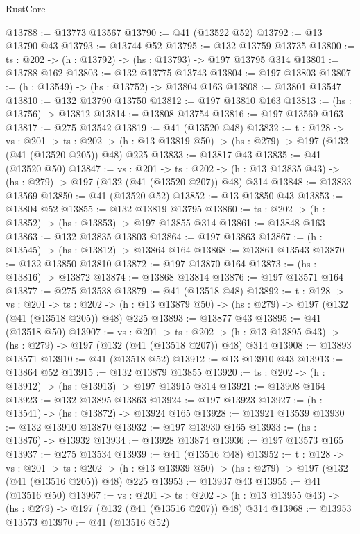 \begin{lexlean}{RustCore}
\begin{coremodule}
@13788 := @13773 @13567
@13790 := @41 (@13522 @52)
@13792 := @13 @13790 @43
@13793 := @13744 @52
@13795 := @132 @13759 @13735
@13800 := {ts : @202} -> (h : @13792) -> (hs : @13793) -> @197 @13795 @314
@13801 := @13788 @162
@13803 := @132 @13775 @13743
@13804 := @197 @13803
@13807 := (h : @13549) -> (hs : @13752) -> @13804 @163
@13808 := @13801 @13547
@13810 := @132 @13790 @13750
@13812 := @197 @13810 @163
@13813 := (hs : @13756) -> @13812
@13814 := @13808 @13754
@13816 := @197 @13569 @163
@13817 := @275 @13542
@13819 := @41 (@13520 @48)
@13832 := {t : @128} ->
  {vs : @201} ->
  {ts : @202} -> (h : @13 @13819 @50) -> (hs : @279) -> @197 (@132 (@41 (@13520 @205)) @48) @225
@13833 := @13817 @43
@13835 := @41 (@13520 @50)
@13847 := {vs : @201} ->
  {ts : @202} -> (h : @13 @13835 @43) -> (hs : @279) -> @197 (@132 (@41 (@13520 @207)) @48) @314
@13848 := @13833 @13569
@13850 := @41 (@13520 @52)
@13852 := @13 @13850 @43
@13853 := @13804 @52
@13855 := @132 @13819 @13795
@13860 := {ts : @202} -> (h : @13852) -> (hs : @13853) -> @197 @13855 @314
@13861 := @13848 @163
@13863 := @132 @13835 @13803
@13864 := @197 @13863
@13867 := (h : @13545) -> (hs : @13812) -> @13864 @164
@13868 := @13861 @13543
@13870 := @132 @13850 @13810
@13872 := @197 @13870 @164
@13873 := (hs : @13816) -> @13872
@13874 := @13868 @13814
@13876 := @197 @13571 @164
@13877 := @275 @13538
@13879 := @41 (@13518 @48)
@13892 := {t : @128} ->
  {vs : @201} ->
  {ts : @202} -> (h : @13 @13879 @50) -> (hs : @279) -> @197 (@132 (@41 (@13518 @205)) @48) @225
@13893 := @13877 @43
@13895 := @41 (@13518 @50)
@13907 := {vs : @201} ->
  {ts : @202} -> (h : @13 @13895 @43) -> (hs : @279) -> @197 (@132 (@41 (@13518 @207)) @48) @314
@13908 := @13893 @13571
@13910 := @41 (@13518 @52)
@13912 := @13 @13910 @43
@13913 := @13864 @52
@13915 := @132 @13879 @13855
@13920 := {ts : @202} -> (h : @13912) -> (hs : @13913) -> @197 @13915 @314
@13921 := @13908 @164
@13923 := @132 @13895 @13863
@13924 := @197 @13923
@13927 := (h : @13541) -> (hs : @13872) -> @13924 @165
@13928 := @13921 @13539
@13930 := @132 @13910 @13870
@13932 := @197 @13930 @165
@13933 := (hs : @13876) -> @13932
@13934 := @13928 @13874
@13936 := @197 @13573 @165
@13937 := @275 @13534
@13939 := @41 (@13516 @48)
@13952 := {t : @128} ->
  {vs : @201} ->
  {ts : @202} -> (h : @13 @13939 @50) -> (hs : @279) -> @197 (@132 (@41 (@13516 @205)) @48) @225
@13953 := @13937 @43
@13955 := @41 (@13516 @50)
@13967 := {vs : @201} ->
  {ts : @202} -> (h : @13 @13955 @43) -> (hs : @279) -> @197 (@132 (@41 (@13516 @207)) @48) @314
@13968 := @13953 @13573
@13970 := @41 (@13516 @52)

\end{coremodule}
\end{lexlean}

